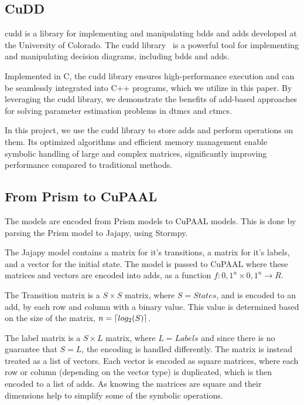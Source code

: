\subsection{CuDD}\label{subsec:cudd}
\acrfull{cudd} is a library for implementing and manipulating \glspl{bdd} and \glspl{add} developed at the University of Colorado.
The \gls{cudd} library~\cite{somenzi1997cudd} is a powerful tool for implementing and manipulating decision diagrams, including \glspl{bdd} and \glspl{add}.

Implemented in C, the \gls{cudd} library ensures high-performance execution and can be seamlessly integrated into C++ programs, which we utilize in this paper.
By leveraging the \gls{cudd} library, we demonstrate the benefits of \gls{add}-based approaches for solving parameter estimation problems in \glspl{dtmc} and \glspl{ctmc}.

In this project, we use the \gls{cudd} library to store \glspl{add} and perform operations on them.
Its optimized algorithms and efficient memory management enable symbolic handling of large and complex matrices, significantly improving performance compared to traditional methods.



\subsection{From Prism to CuPAAL}\label{subsec:from_prism_to_cupaal}
The models are encoded from Prism models to CuPAAL models. This is done by parsing the Prism model to Jajapy, using Stormpy.

The Jajapy model contains a matrix for it's transitions, a matrix for it's labels, and a vector for the initial state.
The model is passed to CuPAAL where these matrices and vectors are encoded into \glspl{add}, as a function $f \colon {0,1}^n \times {0,1}^n \to R$.

The Transition matrix is a $S\times S$ matrix, where $S=States$, and is encoded to an \gls{add}, by each row and column with a binary value. This value is determined based on the size of the matrix,
$n = \left\lceil log_2(S) \right\rceil$.

The label matrix is a $S\times L$ matrix, where $L=Labels$ and since there is no guarantee that $S = L$, the encoding is handled differently.
The matrix is instead treated as a list of vectors.
Each vector is encoded as square matrices, where each row or column (depending on the vector type) is duplicated, which is then encoded to a list of \glspl{add}.
As knowing the matrices are square and their dimensions help to simplify some of the symbolic operations.

